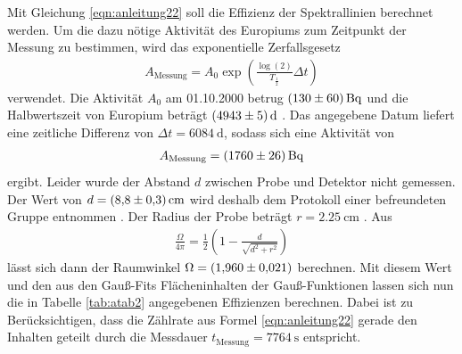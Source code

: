 Mit Gleichung \eqref{eqn:anleitung22} soll die Effizienz der Spektrallinien berechnet werden.
Um die dazu nötige Aktivität des Europiums zum Zeitpunkt der Messung zu bestimmen, wird das exponentielle Zerfallsgesetz
\begin{align}
A_\text{Messung}=A_0\exp\left(\frac{\log(2)}{T_{\frac{1}{2}}}\Delta t\right)
\end{align}
verwendet.
Die Aktivität $A_0$ am 01.10.2000 betrug $\SI{130+-60}{\becquerel}$ und die Halbwertszeit von Europium beträgt $\SI{4943+-5}{\day}$ \cite{sample}.
Das angegebene Datum liefert eine zeitliche Differenz von $\Delta t=\SI{6084}{\day}$, sodass sich eine Aktivität von 
\begin{align*}
A_\text{Messung}=\SI{1760+-26}{\becquerel}
\end{align*}
ergibt.
Leider wurde der Abstand $d$ zwischen Probe und Detektor nicht gemessen. 
Der Wert von $d=\SI{8.8+-0.3}{\centi\meter}$ wird deshalb dem Protokoll einer befreundeten Gruppe entnommen \cite{abstand}.
Der Radius der Probe beträgt $r=\SI{2.25}{\centi\meter}$ \cite{sample}.
Aus
\begin{align}
\frac{\Omega}{4\pi}=\frac{1}{2}\left( 1- \frac{d}{\sqrt{d^2+r^2}}\right)
\end{align}
lässt sich dann der Raumwinkel $\Omega=\SI{1.96+-0.021}{}$ berechnen.
Mit diesem Wert und den aus den Gauß-Fits Flächeninhalten der Gauß-Funktionen lassen sich nun die in Tabelle \ref{tab:atab2} angegebenen Effizienzen berechnen.
Dabei ist zu Berücksichtigen, dass die Zählrate aus Formel \ref{eqn:anleitung22} gerade den Inhalten geteilt durch die Messdauer $t_\text{Messung}=\SI{7764}{\second}$ entspricht.
